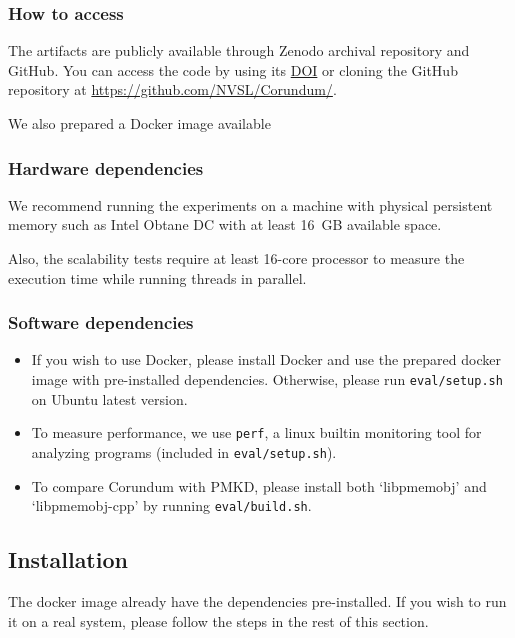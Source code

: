 {\subsubsection{How to access}

The artifacts are publicly available
through Zenodo archival repository and GitHub. You can access the code by using its \href{https://zenodo.org/record/4321062}{DOI} or cloning the GitHub repository at \href{https://github.com/NVSL/Corundum/}{https://github.com/NVSL/Corundum/}.

We also prepared a Docker image available 

\subsubsection{Hardware dependencies}

We recommend running the experiments on a machine with physical persistent memory such as Intel Obtane DC with at least 16~GB available space.

Also, the scalability tests require at least 16-core processor to measure the execution time while running threads in parallel.

\subsubsection{Software dependencies}

\begin{itemize}
  \item If you wish to use Docker, please install Docker and use the prepared docker image with pre-installed dependencies. Otherwise, please run \verb+eval/setup.sh+ on Ubuntu latest version.
  \item To measure performance, we use \verb+perf+, a linux builtin monitoring tool for analyzing programs (included in \verb+eval/setup.sh+).
  \item To compare Corundum with PMKD, please install both `libpmemobj' and `libpmemobj-cpp' by running \verb+eval/build.sh+.
\end{itemize}

\subsection{Installation}

The docker image already have the dependencies pre-installed. If you wish to run it on a real system, please follow the steps in the rest of this section.

}
